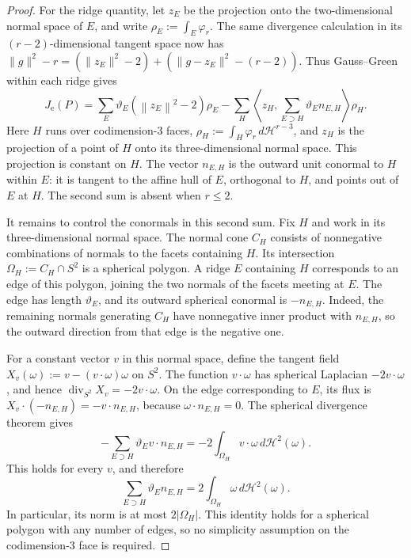 \documentclass[11pt,letterpaper]{article}
\theoremstyle{remark}
\newcommand{\norm}[1]{\left\lVert#1\right\rVert}
\newcommand{\dd}{\,d}
\begin{document}
\begin{proof}
For the ridge quantity, let $z_E$ be the projection onto the
two-dimensional normal space of $E$, and write $\rho_E:=\int_E\varphi_r$.
The same divergence calculation in its $(r-2)$-dimensional tangent
space now has $\|g\|^2-r=(\|z_E\|^2-2)
 +(\|g-z_E\|^2-(r-2))$. Thus Gauss--Green within each ridge gives
\begin{equation}
 J_{\mathrm e}(P)
 =\sum_E\vartheta_E(\norm{z_E}^2-2)\rho_E
 -\sum_H\left\langle z_H,
        \sum_{E\supset H}\vartheta_E n_{E,H}\right\rangle\rho_H.
 \label{hgap:eq:edge-identity}
\end{equation}
Here $H$ runs over codimension-$3$ faces,
$\rho_H:=\int_H\varphi_r\dd\mathcal H^{r-3}$, and $z_H$ is the
projection of a point of $H$ onto its three-dimensional normal space.
This projection is constant on $H$. The vector $n_{E,H}$ is the
outward unit conormal to $H$ within $E$: it is tangent to the affine
hull of $E$, orthogonal to $H$, and points out of $E$ at $H$.
The second sum is absent when $r\le2$.

It remains to control the conormals in this second sum. Fix $H$ and
work in its three-dimensional normal space. The normal cone
$C_H$ consists of nonnegative combinations of normals to the facets
containing $H$. Its intersection $\Omega_H:=C_H\cap S^2$ is a spherical
polygon. A ridge $E$ containing $H$ corresponds to an edge of this
polygon, joining the two normals of the facets meeting at $E$.
The edge has length $\vartheta_E$, and its outward spherical conormal
is $-n_{E,H}$. Indeed, the remaining normals generating $C_H$ have
nonnegative inner product with $n_{E,H}$, so the outward direction
from that edge is the negative one.

For a constant vector $v$ in this normal space, define the tangent
field $X_v(\omega):=v-(v\cdot\omega)\omega$ on $S^2$.
The function $v\cdot\omega$ has spherical Laplacian
$-2v\cdot\omega$, and hence
$\operatorname{div}_{S^2}X_v=-2v\cdot\omega$.
On the edge corresponding to $E$, its flux is
$X_v\cdot(-n_{E,H})=-v\cdot n_{E,H}$, because
$\omega\cdot n_{E,H}=0$. The spherical divergence theorem gives
\[
 -\sum_{E\supset H}\vartheta_E v\cdot n_{E,H}
 =-2\int_{\Omega_H}v\cdot\omega\dd\mathcal H^2(\omega).
\]
This holds for every $v$, and therefore
\begin{equation}
 \sum_{E\supset H}\vartheta_E n_{E,H}
 =2\int_{\Omega_H}\omega\dd\mathcal H^2(\omega).
 \label{hgap:eq:spherical-balance}
\end{equation}
In particular, its norm is at most $2|\Omega_H|$. This identity holds
for a spherical polygon with any number of edges, so no simplicity
assumption on the codimension-$3$ face is required.


\end{proof}
\end{document}
